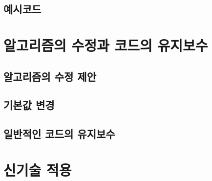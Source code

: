 
\section{예시코드}


\chapter{알고리즘의 수정과 코드의 유지보수}

\section{알고리즘의 수정 제안}


\section{기본값 변경}


\section{일반적인 코드의 유지보수}



\chapter{신기술 적용}

